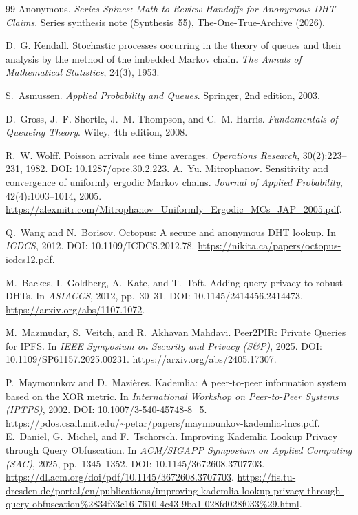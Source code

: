 \documentclass[11pt]{article}
\theoremstyle{definition}
\theoremstyle{remark}
\begin{document}
\begin{thebibliography}{99}
Anonymous.
\newblock \emph{Series Spines: Math-to-Review Handoffs for Anonymous DHT Claims}.
\newblock Series synthesis note (Synthesis~55), The-One-True-Archive (2026).

D.~G. Kendall.
\newblock Stochastic processes occurring in the theory of queues and their analysis by the method of the imbedded Markov chain.
\newblock \emph{The Annals of Mathematical Statistics}, 24(3), 1953.

S.~Asmussen.
\newblock \emph{Applied Probability and Queues}.
\newblock Springer, 2nd edition, 2003.


D.~Gross, J.~F. Shortle, J.~M. Thompson, and C.~M. Harris.
\newblock \emph{Fundamentals of Queueing Theory}.
\newblock Wiley, 4th edition, 2008.

R.~W. Wolff.
\newblock Poisson arrivals see time averages.
\newblock \emph{Operations Research}, 30(2):223--231, 1982.
\newblock DOI: 10.1287/opre.30.2.223.
A.~Yu. Mitrophanov.
\newblock Sensitivity and convergence of uniformly ergodic Markov chains.
\newblock \emph{Journal of Applied Probability}, 42(4):1003--1014, 2005.
\newblock \url{https://alexmitr.com/Mitrophanov_Uniformly_Ergodic_MCs_JAP_2005.pdf}.

Q.~Wang and N.~Borisov.
\newblock Octopus: A secure and anonymous DHT lookup.
\newblock In \emph{ICDCS}, 2012.
\newblock DOI: 10.1109/ICDCS.2012.78.
\newblock \url{https://nikita.ca/papers/octopus-icdcs12.pdf}.

M.~Backes, I.~Goldberg, A.~Kate, and T.~Toft.
\newblock Adding query privacy to robust DHTs.
\newblock In \emph{ASIACCS}, 2012, pp.~30--31.
\newblock DOI: 10.1145/2414456.2414473. \url{https://arxiv.org/abs/1107.1072}.


M.~Mazmudar, S.~Veitch, and R.~Akhavan Mahdavi.
\newblock Peer2PIR: Private Queries for IPFS.
\newblock In \emph{IEEE Symposium on Security and Privacy (S\&P)}, 2025.
\newblock DOI: 10.1109/SP61157.2025.00231.
\newblock \url{https://arxiv.org/abs/2405.17307}.

P.~Maymounkov and D.~Mazi\`eres.
\newblock Kademlia: A peer-to-peer information system based on the XOR metric.
\newblock In \emph{International Workshop on Peer-to-Peer Systems (IPTPS)}, 2002.
\newblock DOI: 10.1007/3-540-45748-8\_5. \url{https://pdos.csail.mit.edu/~petar/papers/maymounkov-kademlia-lncs.pdf}.
E.~Daniel, G.~Michel, and F.~Tschorsch.
\newblock Improving Kademlia Lookup Privacy through Query Obfuscation.
\newblock In \emph{ACM/SIGAPP Symposium on Applied Computing (SAC)}, 2025, pp.~1345--1352.
\newblock DOI: 10.1145/3672608.3707703.
\newblock \url{https://dl.acm.org/doi/pdf/10.1145/3672608.3707703}.
\newblock \url{https://fis.tu-dresden.de/portal/en/publications/improving-kademlia-lookup-privacy-through-query-obfuscation%2834f33c16-7610-4c43-9ba1-028fd028f033%29.html}.


\end{thebibliography}
\end{document}
